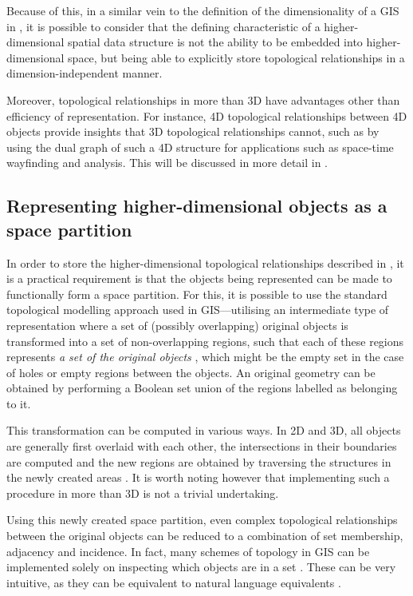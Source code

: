 Because of this, in a similar vein to the definition of the dimensionality of a GIS in \citet{Hazelton90}, it is possible to consider that the defining characteristic of a higher-dimensional spatial data structure is not the ability to be embedded into higher-dimensional space, but being able to explicitly store topological relationships in a dimension-independent manner.

Moreover, topological relationships in more than 3D have advantages other than efficiency of representation.
For instance, 4D topological relationships between 4D objects provide insights that 3D topological relationships cannot, such as by using the dual graph of such a 4D structure for applications such as space-time wayfinding and analysis.
This will be discussed in more detail in .

\subsection{Representing higher-dimensional objects as a space partition}
\label{ss:nd-partition}

In order to store the higher-dimensional topological relationships described in , it is a practical requirement is that the objects being represented can be made to functionally form a space partition.
For this, it is possible to use the standard topological modelling approach used in GIS---utilising an intermediate type of representation where a set of (possibly overlapping) original objects is transformed into a set of non-overlapping regions, such that each of these regions represents \emph{a set of the original objects} \citep{Rossignac89}, which might be the empty set in the case of holes or empty regions between the objects.
An original geometry can be obtained by performing a Boolean set union of the regions labelled as belonging to it.

This transformation can be computed in various ways.
In 2D and 3D, all objects are generally first overlaid with each other, the intersections in their boundaries are computed and the new regions are obtained by traversing the structures in the newly created areas \citep[\S{}2.3]{deBerg08}.
It is worth noting however that implementing such a procedure in more than 3D is not a trivial undertaking.

Using this newly created space partition, even complex topological relationships between the original objects can be reduced to a combination of set membership, adjacency and incidence.
In fact, many schemes of topology in GIS can be implemented solely on inspecting which objects are in a set \citep{Egenhofer91,Worboys92a,Guting00}.
These can be very intuitive, as they can be equivalent to natural language equivalents \citep{Dube12}.

